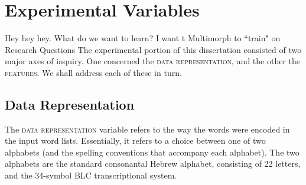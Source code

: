 \section{Experimental Variables}\label{sec:expvars}
Hey hey hey. What do we want to learn? I want t Multimorph to ``train" on 
Research Questions
The experimental portion of this dissertation consisted of two major axes of inquiry. One concerned the \textsc{data representation}, and the other the \textsc{features}. We shall address each of these in turn. 


\subsection{Data Representation}\label{sev:expvars:datarep}

The \textsc{data representation} variable refers to the way the words were encoded in the input
word lists. Essentially, it refers to a choice between one of two alphabets (and the spelling conventions that 
accompany each alphabet). The two alphabets are the standard consonantal Hebrew alphabet, consisting of 22 letters,
and the 34-symbol BLC transcriptional system. 






 

